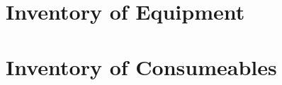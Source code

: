 \documentclass{./BeekeepingBook}
\begin{document}
\section{Inventory of Equipment}

\section{Inventory of Consumeables}
 
\end{document}
